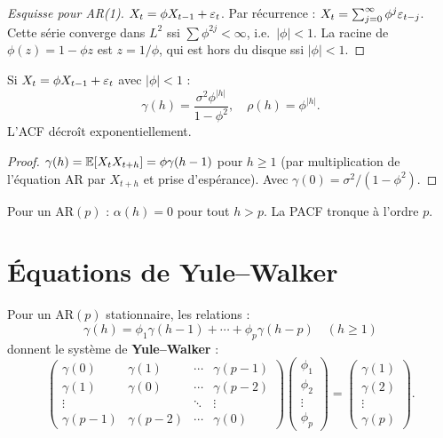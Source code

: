 \begin{proof}[Esquisse pour AR(1)]
$X_t = \phi X_{t-1}+\varepsilon_t$. Par r\'ecurrence : $X_t = \sum_{j=0}^{\infty}\phi^j\varepsilon_{t-j}$. Cette s\'erie converge dans $L^2$ ssi $\sum\phi^{2j}<\infty$, i.e.\ $|\phi|<1$. La racine de $\phi(z)=1-\phi z$ est $z=1/\phi$, qui est hors du disque ssi $|\phi|<1$.
\end{proof}

\begin{theoreme}[ACF d'un AR(1)]
Si $X_t = \phi X_{t-1}+\varepsilon_t$ avec $|\phi|<1$ :
\[
\gamma(h) = \frac{\sigma^2\phi^{|h|}}{1-\phi^2}, \quad \rho(h)=\phi^{|h|}.
\]
L'ACF d\'ecro\^it exponentiellement.
\end{theoreme}

\begin{proof}
$\gamma(h)=\mathbb{E}[X_t X_{t+h}]=\phi\gamma(h-1)$ pour $h\geq 1$ (par multiplication de l'\'equation AR par $X_{t+h}$ et prise d'esp\'erance). Avec $\gamma(0)=\sigma^2/(1-\phi^2)$.
\end{proof}

\begin{theoreme}[PACF d'un AR$(p)$]
Pour un AR$(p)$ : $\alpha(h)=0$ pour tout $h>p$. La PACF tronque \`a l'ordre $p$.
\end{theoreme}

\section{\'Equations de Yule--Walker}

\begin{definition}
Pour un AR$(p)$ stationnaire, les relations :
\[
\gamma(h) = \phi_1\gamma(h-1)+\cdots+\phi_p\gamma(h-p) \quad (h\geq 1)
\]
donnent le syst\`eme de \textbf{Yule--Walker} :
\[
\begin{pmatrix}\gamma(0)&\gamma(1)&\cdots&\gamma(p-1)\\\gamma(1)&\gamma(0)&\cdots&\gamma(p-2)\\\vdots&&\ddots&\vdots\\\gamma(p-1)&\gamma(p-2)&\cdots&\gamma(0)\end{pmatrix}
\begin{pmatrix}\phi_1\\\phi_2\\\vdots\\\phi_p\end{pmatrix}
=\begin{pmatrix}\gamma(1)\\\gamma(2)\\\vdots\\\gamma(p)\end{pmatrix}.
\]
\end{definition}

